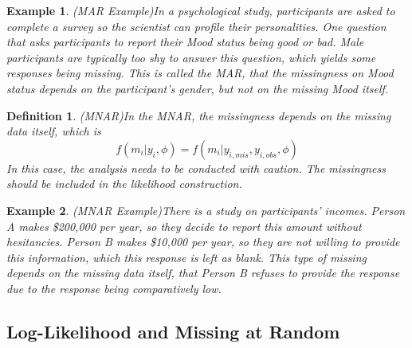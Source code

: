 \documentclass[preprint,12pt]{elsarticle}
\newtheorem{defn}{Definition}
\newtheorem{eg}{Example}
\begin{document}
\begin{eg}(MAR Example)\label{eg:MARExample}
    In a psychological study, participants are asked to complete a survey so the scientist can profile their personalities. 
    One question that asks participants to report their Mood status being good or bad. 
    Male participants are typically too shy to answer this question, which yields some responses being missing. 
    This is called the MAR, that the missingness on Mood status depends on the participant's gender, but not on the missing Mood itself.
\end{eg}
\begin{defn}(MNAR)\label{defn:MNAR}
    In the MNAR, the missingness depends on the missing data itself, which is 
    \begin{equation} 
        f(m_i|y_i,\phi)=f(m_i|y_{i,mis}, y_{i,obs}, \phi)
    \end{equation}
    In this case, the analysis needs to be conducted with caution. 
    The missingness should be included in the likelihood construction.
\end{defn}
\begin{eg}(MNAR Example)\label{eg:MNARExample}
    There is a study on participants' incomes. 
    Person A makes \$200,000 per year, so they decide to report this amount without hesitancies. 
    Person B makes \$10,000 per year, so they are not willing to provide this information, which this response is left as blank. 
    This type of missing depends on the missing data itself, that Person B refuses to provide the response due to the response being comparatively low. 
\end{eg}
\subsection{Log-Likelihood and Missing at Random}
\end{document}
